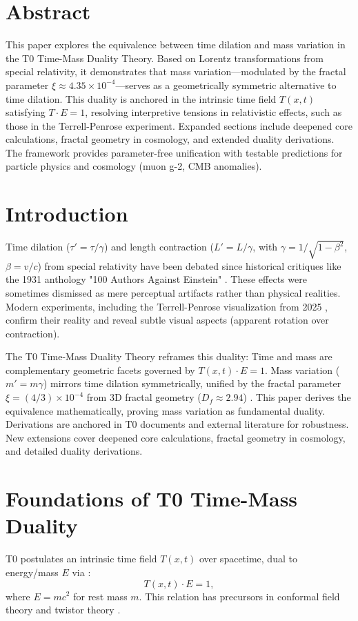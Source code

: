 \section*{Abstract}
		This paper explores the equivalence between time dilation and mass variation in the T0 Time-Mass Duality Theory. Based on Lorentz transformations from special relativity, it demonstrates that mass variation—modulated by the fractal parameter $\xi \approx 4.35 \times 10^{-4}$—serves as a geometrically symmetric alternative to time dilation. This duality is anchored in the intrinsic time field $T(x,t)$ satisfying $T \cdot E = 1$, resolving interpretive tensions in relativistic effects, such as those in the Terrell-Penrose experiment. Expanded sections include deepened core calculations, fractal geometry in cosmology, and extended duality derivations. The framework provides parameter-free unification with testable predictions for particle physics and cosmology (muon g-2, CMB anomalies).

	
	\section{Introduction}
	Time dilation ($\tau' = \tau / \gamma$) and length contraction ($L' = L / \gamma$, with $\gamma = 1 / \sqrt{1 - \beta^2}$, $\beta = v/c$) from special relativity have been debated since historical critiques like the 1931 anthology "100 Authors Against Einstein" \cite{hundert1931}. These effects were sometimes dismissed as mere perceptual artifacts rather than physical realities. Modern experiments, including the Terrell-Penrose visualization from 2025 \cite{terrell2025}, confirm their reality and reveal subtle visual aspects (apparent rotation over contraction).
	
	The T0 Time-Mass Duality Theory \cite{pascher2025t0} reframes this duality: Time and mass are complementary geometric facets governed by $T(x,t) \cdot E = 1$. Mass variation ($m' = m \gamma$) mirrors time dilation symmetrically, unified by the fractal parameter $\xi = (4/3) \times 10^{-4}$ from 3D fractal geometry ($D_f \approx 2.94$) \cite{pascher2025si}. This paper derives the equivalence mathematically, proving mass variation as fundamental duality. Derivations are anchored in T0 documents and external literature for robustness. New extensions cover deepened core calculations, fractal geometry in cosmology, and detailed duality derivations.
	
	\section{Foundations of T0 Time-Mass Duality}
	T0 postulates an intrinsic time field $T(x,t)$ over spacetime, dual to energy/mass $E$ via \cite{pascher2025qm, penrose2004}:
	\begin{equation}
		T(x,t) \cdot E = 1,
	\end{equation}
	where $E = m c^2$ for rest mass $m$. This relation has precursors in conformal field theory \cite{francesco1997} and twistor theory \cite{penrose1967}.
	
